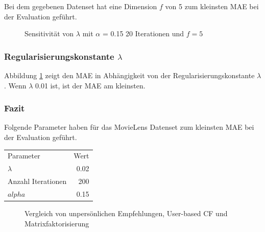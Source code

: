 \documentclass[a4paper, 12pt]{article}
\begin{document}
Bei dem gegebenen Datenset hat eine Dimension $f$ von 5 zum kleinsten MAE bei der Evaluation geführt.

\begin{figure}
  \centering
{}
\caption{Sensitivität von $\lambda$ mit $\alpha$ = 0.15 20 Iterationen und $f = 5$}
\label{fig:lambda}
\end{figure}

\subsubsection{Regularisierungskonstante $\lambda$}

Abbildung \ref{fig:lambda} zeigt den MAE in Abhängigkeit von der Regularisierungskonstante $\lambda$. Wenn $\lambda$ 0.01 ist, ist der MAE am kleinsten.

\subsubsection{Fazit}

Folgende Parameter haben für das MovieLens Datenset zum kleinsten MAE bei der Evaluation geführt.

\begin{center}
\begin{tabular}{lr}
 Parameter           &  Wert  \\
 $\lambda$              &  0.02  \\
 Anzahl Iterationen  &    200  \\
 $alpha$             &  0.15 \\
\end{tabular}
\end{center}

\begin{figure}
\centering
\caption{Vergleich von unpersönlichen Empfehlungen, User-based CF und Matrixfaktorisierung}
\label{fig:compare}
\end{figure}
\end{document}
